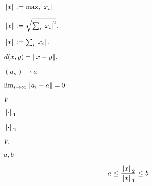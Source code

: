 \documentclass[10pt]{book}
\begin{document}
\begin{mdSnippets}
\begin{mdInlineSnippet}[00917ca72c7f74debc70f008746dd602]%
$\norm{x} \coloneqq \max_i \left\vert x_i\right\vert$\end{mdInlineSnippet}%
\begin{mdInlineSnippet}[cdb09fe2967ac03813437e5a612037b0]%
$\norm{x} \coloneqq \sqrt{\sum_i \left\vert x_i\right\vert^2}.$\end{mdInlineSnippet}%
\begin{mdInlineSnippet}[651172bbf1124d5431154973ef2ab17b]%
$\norm{x} \coloneqq \sum_i \left\vert x_i\right\vert.$\end{mdInlineSnippet}%
\begin{mdInlineSnippet}[39a41e1424b3355a8904fb82f2b83d43]%
$d(x,y) = \norm{x-y}.$\end{mdInlineSnippet}%
\begin{mdInlineSnippet}[128a7ec99cd3d7fb6bc9f20330d6530a]%
$(a_n) \to a$\end{mdInlineSnippet}%
\begin{mdInlineSnippet}[90550906a9bf99f97847c77130569271]%
$\lim_{i \to \infty} \norm{a_i - a} = 0.$\end{mdInlineSnippet}%
\begin{mdInlineSnippet}[5206560a306a2e085a437fd258eb57ce]%
$V$\end{mdInlineSnippet}%
\begin{mdInlineSnippet}[ebbcacc5f90630860b95eb257b007b9a]%
$\norm{\cdot}_1$\end{mdInlineSnippet}%
\begin{mdInlineSnippet}[b74a8c5fe50151e1fafde6da43b1fe8a]%
$\norm{\cdot}_2$\end{mdInlineSnippet}%
\begin{mdInlineSnippet}[a787dbc2f9902096a8fb13903dd63428]%
$V,$\end{mdInlineSnippet}%
\begin{mdInlineSnippet}[b345e1dc09f20fdefdea469f09167892]%
$a,b$\end{mdInlineSnippet}%
\begin{mdDisplaySnippet}[b7b6df373ffcb5df066f5cc70d81c0ce]%
\[%
a \le \frac{\norm{x}_2}{\norm{x}_1} \le b
\]%
\end{mdDisplaySnippet}%
\begin{mdInlineSnippet}[3198651f791aee4036bd038ad164424f]%

\end{mdInlineSnippet}
\end{mdSnippets}
\end{document}
